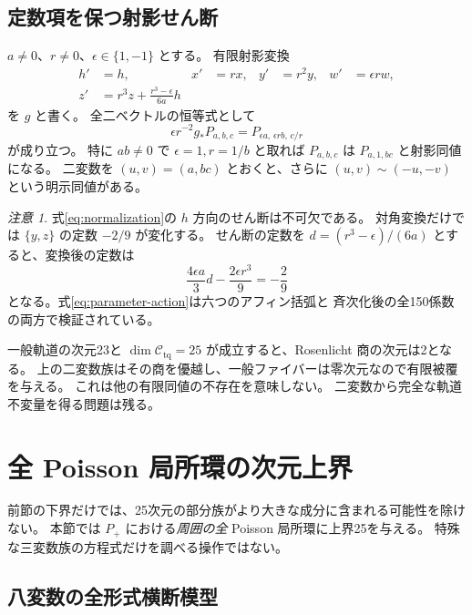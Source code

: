 \documentclass[11pt,a4paper]{ltjsarticle}
\newcommand{\cC}{\mathcal C_{\mathrm{tq}}}
\theoremstyle{remark}
\newtheorem{remark}[theorem]{注意}
\begin{document}
\subsection{定数項を保つ射影せん断}

$a\ne0$、$r\ne0$、$\epsilon\in\{1,-1\}$ とする。
有限射影変換
\begin{equation}\label{eq:normalization}
\begin{aligned}
 h'&=h,& x'&=rx,& y'&=r^2y,& w'&=\epsilon r w,\\
 z'&=r^3z+\frac{r^3-\epsilon}{6a}h
\end{aligned}
\end{equation}
を $g$ と書く。
全二ベクトルの恒等式として
\begin{equation}\label{eq:parameter-action}
 \epsilon r^{-2}g_*P_{a,b,c}=P_{\epsilon a,\,\epsilon rb,\,c/r}
\end{equation}
が成り立つ。
特に $ab\ne0$ で $\epsilon=1,r=1/b$ と取れば
$P_{a,b,c}$ は $P_{a,1,bc}$ と射影同値になる。
二変数を $(u,v)=(a,bc)$ とおくと、さらに $(u,v)\sim(-u,-v)$ という明示同値がある。

\begin{remark}
式\eqref{eq:normalization}の $h$ 方向のせん断は不可欠である。
対角変換だけでは $\{y,z\}$ の定数 $-2/9$ が変化する。
せん断の定数を $d=(r^3-\epsilon)/(6a)$ とすると、変換後の定数は
\[
 \frac{4\epsilon a}3d-\frac{2\epsilon r^3}9=-\frac29
\]
となる。式\eqref{eq:parameter-action}は六つのアフィン括弧と
斉次化後の全150係数の両方で検証されている。
\end{remark}

一般軌道の次元23と $\dim\cC=25$ が成立すると、Rosenlicht 商の次元は2となる。
上の二変数族はその商を優越し、一般ファイバーは零次元なので有限被覆を与える。
これは他の有限同値の不存在を意味しない。
二変数から完全な軌道不変量を得る問題は残る。

\section{全 Poisson 局所環の次元上界}\label{sec:upper}

前節の下界だけでは、25次元の部分族がより大きな成分に含まれる可能性を除けない。
本節では $P_+$ における\emph{周囲の全} Poisson 局所環に上界25を与える。
特殊な三変数族の方程式だけを調べる操作ではない。

\subsection{八変数の全形式横断模型}
\end{document}
